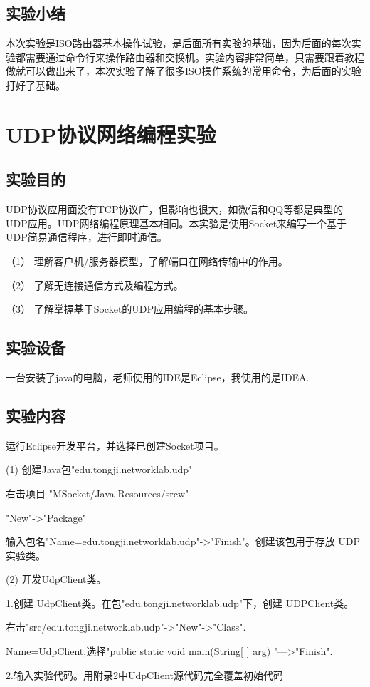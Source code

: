 \documentclass[lang=cn,11pt,a4paper,cite=authoryear]{elegantpaper}
\begin{document}
\subsection{实验小结}
本次实验是ISO路由器基本操作试验，是后面所有实验的基础，因为后面的每次实验都需要通过命令行来操作路由器和交换机。实验内容非常简单，只需要跟着教程做就可以做出来了，本次实验了解了很多ISO操作系统的常用命令，为后面的实验打好了基础。

\section{UDP协议网络编程实验}
\subsection{实验目的}
UDP协议应用面没有TCP协议广，但影响也很大，如微信和QQ等都是典型的UDP应用。UDP网络编程原理基本相同。本实验是使用Socket来编写一个基于UDP简易通信程序，进行即时通信。

（1）	理解客户机/服务器模型，了解端口在网络传输中的作用。

（2）	了解无连接通信方式及编程方式。

（3）	了解掌握基于Socket的UDP应用编程的基本步骤。 

\subsection{实验设备}
一台安装了java的电脑，老师使用的IDE是Eclipse，我使用的是IDEA.
\subsection{实验内容}
运行Eclipse开发平台，并选择已创建Socket项目。

(1)	创建Java包"edu.tongji.networklab.udp"

右击项目 "MSocket/Java Resources/srcw"

"New"->"Package"

输入包名"Name=edu.tongji.networklab.udp"->"Finish"。创建该包用于存放 UDP 实验类。

(2)	开发UdpClient类。

	1.创建 UdpClient类。在包"edu.tongji.networklab.udp"下，创建 UDPClient类。 

右击"src/edu.tongji.networklab.udp"->"New"->"Class".

Name=UdpClient,选择"public static void main(String[ ] arg) "—>"Finish".

	2.输入实验代码。用附录2中UdpCIient源代码完全覆盖初始代码
\end{document}
